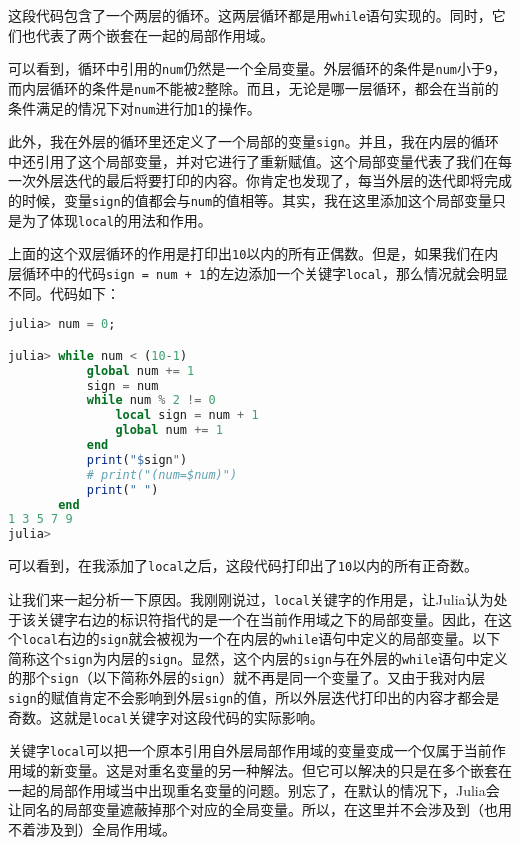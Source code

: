 这段代码包含了一个两层的循环。这两层循环都是用\verb|while|语句实现的。同时，它们也代表了两个嵌套在一起的局部作用域。

可以看到，循环中引用的\verb|num|仍然是一个全局变量。外层循环的条件是\verb|num|小于\verb|9|，而内层循环的条件是\verb|num|不能被\verb|2|整除。而且，无论是哪一层循环，都会在当前的条件满足的情况下对\verb|num|进行加\verb|1|的操作。

此外，我在外层的循环里还定义了一个局部的变量\verb|sign|。并且，我在内层的循环中还引用了这个局部变量，并对它进行了重新赋值。这个局部变量代表了我们在每一次外层迭代的最后将要打印的内容。你肯定也发现了，每当外层的迭代即将完成的时候，变量\verb|sign|的值都会与\verb|num|的值相等。其实，我在这里添加这个局部变量只是为了体现\verb|local|的用法和作用。

上面的这个双层循环的作用是打印出\verb|10|以内的所有正偶数。但是，如果我们在内层循环中的代码\verb|sign = num + 1|的左边添加一个关键字\verb|local|，那么情况就会明显不同。代码如下：

\begin{lstlisting}[language=julia]
julia> num = 0;

julia> while num < (10-1) 
           global num += 1
           sign = num
           while num % 2 != 0
               local sign = num + 1
               global num += 1
           end
           print("$sign")
           # print("(num=$num)")
           print(" ")
       end
1 3 5 7 9 
julia> 
\end{lstlisting}

可以看到，在我添加了\verb|local|之后，这段代码打印出了\verb|10|以内的所有正奇数。

让我们来一起分析一下原因。我刚刚说过，\verb|local|关键字的作用是，让Julia认为处于该关键字右边的标识符指代的是一个在当前作用域之下的局部变量。因此，在这个\verb|local|右边的\verb|sign|就会被视为一个在内层的\verb|while|语句中定义的局部变量。以下简称这个\verb|sign|为内层的\verb|sign|。显然，这个内层的\verb|sign|与在外层的\verb|while|语句中定义的那个\verb|sign|（以下简称外层的\verb|sign|）就不再是同一个变量了。又由于我对内层\verb|sign|的赋值肯定不会影响到外层\verb|sign|的值，所以外层迭代打印出的内容才都会是奇数。这就是\verb|local|关键字对这段代码的实际影响。

关键字\verb|local|可以把一个原本引用自外层局部作用域的变量变成一个仅属于当前作用域的新变量。这是对重名变量的另一种解法。但它可以解决的只是在多个嵌套在一起的局部作用域当中出现重名变量的问题。别忘了，在默认的情况下，Julia会让同名的局部变量遮蔽掉那个对应的全局变量。所以，在这里并不会涉及到（也用不着涉及到）全局作用域。

